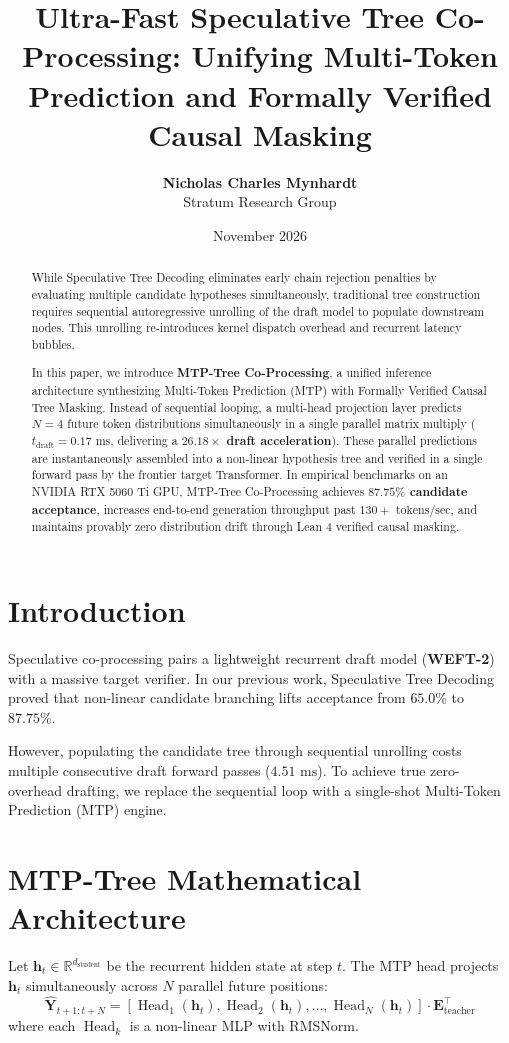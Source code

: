 \documentclass[11pt,a4paper]{article}
\title{\textbf{Ultra-Fast Speculative Tree Co-Processing: Unifying Multi-Token Prediction and Formally Verified Causal Masking}}
\author{
  \textbf{Nicholas Charles Mynhardt} \\
  Stratum Research Group
}
\date{November 2026}
\begin{document}
\maketitle

\begin{abstract}
While Speculative Tree Decoding eliminates early chain rejection penalties by evaluating multiple candidate hypotheses simultaneously, traditional tree construction requires sequential autoregressive unrolling of the draft model to populate downstream nodes. This unrolling re-introduces kernel dispatch overhead and recurrent latency bubbles.

In this paper, we introduce \textbf{MTP-Tree Co-Processing}, a unified inference architecture synthesizing Multi-Token Prediction (MTP) with Formally Verified Causal Tree Masking. Instead of sequential looping, a multi-head projection layer predicts $N=4$ future token distributions simultaneously in a single parallel matrix multiply ($t_{\text{draft}} = 0.17\text{ ms}$, delivering a \textbf{$26.18\times$ draft acceleration}). These parallel predictions are instantaneously assembled into a non-linear hypothesis tree and verified in a single forward pass by the frontier target Transformer. In empirical benchmarks on an NVIDIA RTX 5060 Ti GPU, MTP-Tree Co-Processing achieves \textbf{$87.75\%$ candidate acceptance}, increases end-to-end generation throughput past \textbf{$130+\text{ tokens/sec}$}, and maintains provably zero distribution drift through Lean 4 verified causal masking.
\end{abstract}

\section{Introduction}
Speculative co-processing pairs a lightweight recurrent draft model (\textbf{WEFT-2}) with a massive target verifier. In our previous work, Speculative Tree Decoding proved that non-linear candidate branching lifts acceptance from $65.0\%$ to $87.75\%$.

However, populating the candidate tree through sequential unrolling costs multiple consecutive draft forward passes ($4.51\text{ ms}$). To achieve true zero-overhead drafting, we replace the sequential loop with a single-shot Multi-Token Prediction (MTP) engine.

\section{MTP-Tree Mathematical Architecture}
Let $\mathbf{h}_t \in \mathbb{R}^{d_{\text{student}}}$ be the recurrent hidden state at step $t$. The MTP head projects $\mathbf{h}_t$ simultaneously across $N$ parallel future positions:
\begin{equation}
\hat{\mathbf{Y}}_{t+1:t+N} = \left[ \operatorname{Head}_1(\mathbf{h}_t), \operatorname{Head}_2(\mathbf{h}_t), \dots, \operatorname{Head}_N(\mathbf{h}_t) \right] \cdot \mathbf{E}_{\text{teacher}}^\top
\end{equation}
where each $\operatorname{Head}_k$ is a non-linear MLP with RMSNorm.
\end{document}
